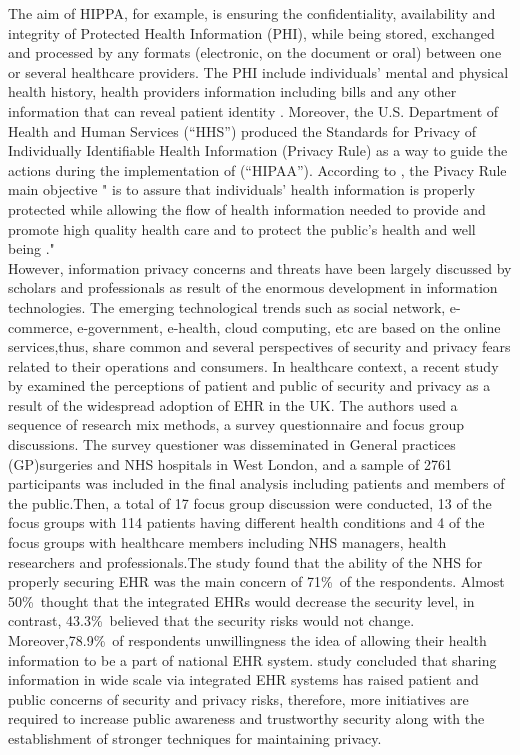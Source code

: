 The aim of HIPPA, for example, is ensuring the confidentiality, availability and integrity of Protected Health Information (PHI), while being stored, exchanged and processed by any formats (electronic, on the document or oral) between one or several healthcare providers. The PHI include individuals' mental and physical health history, health providers information including bills and any other information that can reveal patient identity \cite{U.S.DepartmentofHealthandHumanServices,Rahim2016,Andriole2014a}.
Moreover, the U.S. Department of Health and Human Services (“HHS”) produced the Standards for Privacy of Individually Identifiable Health Information (Privacy Rule) as a way to guide the actions during the implementation of (“HIPAA”). According to \cite{U.S.DepartmentofHealthandHumanServices}, the Pivacy Rule main objective " is to assure that individuals’ health information is properly protected while allowing the flow of health information needed to provide and promote high quality health care and to protect the public's health and well being ."
\\
However, information privacy concerns and threats have been largely discussed by scholars and professionals as result of the enormous development in information technologies. The emerging technological trends such as social network, e-commerce, e-government, e-health, cloud computing, etc are based on the online services,thus, share common and several perspectives of security and privacy fears related to their operations and consumers. In healthcare context, a recent study by \citet{Papoutsi2015} examined the perceptions of patient and public of security and privacy as a result of the widespread adoption of EHR in the UK. The authors used a sequence of research mix methods, a survey questionnaire and focus group discussions. The survey questioner was disseminated in General practices (GP)surgeries and NHS hospitals in West London, and a sample of 2761 participants was included in the final analysis including patients and members of the public.Then, a total of 17 focus group discussion were conducted, 13 of the focus groups with 114 patients having different health conditions and 4 of the focus groups with healthcare members including NHS managers, health researchers and professionals.The study found that the ability of the NHS for properly securing EHR was the main concern of 71\%\ of the respondents.  Almost 50\%\ thought that the integrated EHRs would decrease the security level, in contrast, 43.3\%\ believed that the security risks would not change. Moreover,78.9\%\ of respondents unwillingness the idea of allowing their health information to be a part of national EHR system. \citet{Papoutsi2015}study concluded that sharing information in wide scale via integrated EHR systems has raised patient and public concerns of security and privacy risks, therefore, more initiatives are required to increase public awareness and trustworthy security along with the establishment of stronger techniques for maintaining privacy.

